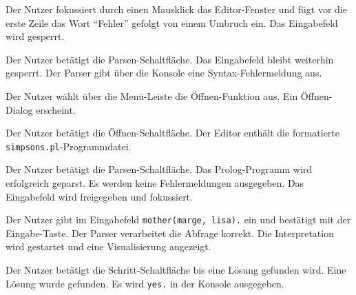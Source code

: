 \documentclass[parskip=full,11pt,twoside]{scrartcl}
\begin{document}
{Der Nutzer fokussiert durch einen Mausklick das Editor-Fenster und fügt vor die erste Zeile das Wort \enquote{Fehler} gefolgt von einem Umbruch ein.}
{Das Eingabefeld wird gesperrt.}

{Der Nutzer betätigt die Parsen-Schaltfläche.}
{Das Eingabefeld bleibt weiterhin gesperrt. Der Parser gibt über die Konsole eine Syntax-Fehlermeldung aus.}


{Der Nutzer wählt über die Menü-Leiste die Öffnen-Funktion aus.}
{Ein Öffnen-Dialog erscheint.}

{Der Nutzer betätigt die Öffnen-Schaltfläche.}
{Der Editor enthält die formatierte \texttt{simpsons.pl}-Programmdatei.}

{Der Nutzer betätigt die Parsen-Schaltfläche.}
{Das Prolog-Programm wird erfolgreich geparst. Es werden keine Fehlermeldungen ausgegeben. Das Eingabefeld wird freigegeben und fokussiert.}

{Der Nutzer gibt im Eingabefeld \texttt{mother(marge, lisa).} ein und bestätigt mit der Eingabe-Taste.}
{Der Parser verarbeitet die Abfrage korrekt. Die Interpretation wird gestartet und eine Visualisierung angezeigt.}

{Der Nutzer betätigt die Schritt-Schaltfläche bis eine Lösung gefunden wird.}
{Eine Lösung wurde gefunden. Es wird \texttt{yes.} in der Konsole ausgegeben.}

\end{document}
